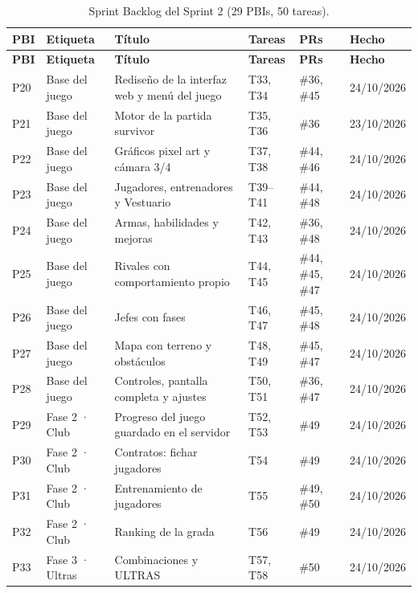 {\small
\begin{longtable}{@{}L{0.7cm} L{2.0cm} L{4.9cm} L{1.6cm} L{2.0cm} L{2.0cm}@{}}
\caption{Sprint Backlog del Sprint 2 (29 PBIs, 50 tareas).}\label{tab:sprint2-backlog}\\
\toprule
\textbf{PBI} & \textbf{Etiqueta} & \textbf{Título} & \textbf{Tareas} & \textbf{PRs} & \textbf{Hecho} \\ \midrule \endfirsthead
\toprule
\textbf{PBI} & \textbf{Etiqueta} & \textbf{Título} & \textbf{Tareas} & \textbf{PRs} & \textbf{Hecho} \\ \midrule \endhead
P20 & Base del juego & Rediseño de la interfaz web y menú del juego & T33, T34 & \#36, \#45 & 24/10/2026 \\
P21 & Base del juego & Motor de la partida survivor & T35, T36 & \#36 & 23/10/2026 \\
P22 & Base del juego & Gráficos pixel art y cámara 3/4 & T37, T38 & \#44, \#46 & 24/10/2026 \\
P23 & Base del juego & Jugadores, entrenadores y Vestuario & T39--T41 & \#44, \#48 & 24/10/2026 \\
P24 & Base del juego & Armas, habilidades y mejoras & T42, T43 & \#36, \#48 & 24/10/2026 \\
P25 & Base del juego & Rivales con comportamiento propio & T44, T45 & \#44, \#45, \#47 & 24/10/2026 \\
P26 & Base del juego & Jefes con fases & T46, T47 & \#45, \#48 & 24/10/2026 \\
P27 & Base del juego & Mapa con terreno y obstáculos & T48, T49 & \#45, \#47 & 24/10/2026 \\
P28 & Base del juego & Controles, pantalla completa y ajustes & T50, T51 & \#36, \#47 & 24/10/2026 \\
P29 & Fase 2 · Club & Progreso del juego guardado en el servidor & T52, T53 & \#49 & 24/10/2026 \\
P30 & Fase 2 · Club & Contratos: fichar jugadores & T54 & \#49 & 24/10/2026 \\
P31 & Fase 2 · Club & Entrenamiento de jugadores & T55 & \#49, \#50 & 24/10/2026 \\
P32 & Fase 2 · Club & Ranking de la grada & T56 & \#49 & 24/10/2026 \\
P33 & Fase 3 · Ultras & Combinaciones y ULTRAS & T57, T58 & \#50 & 24/10/2026 \\

\end{longtable}}
